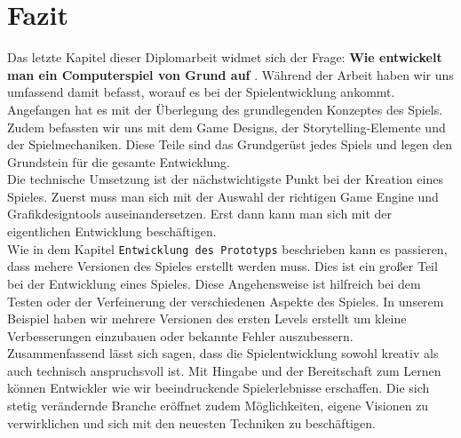 \pagebreak
{}

\chapter{Fazit} %
Das letzte Kapitel dieser Diplomarbeit widmet sich der Frage: \glqq \textbf{Wie entwickelt man ein Computerspiel von Grund auf} \grqq. Während der Arbeit haben wir uns umfassend damit befasst, worauf es bei der Spielentwicklung ankommt. \\

Angefangen hat es mit der Überlegung des grundlegenden Konzeptes des Spiels. Zudem befassten wir uns mit dem Game Designs, der Storytelling-Elemente und der Spielmechaniken. Diese Teile sind das Grundgerüst jedes Spiels und legen den Grundstein für die gesamte Entwicklung.\\

Die technische Umsetzung ist der nächstwichtigste Punkt bei der Kreation eines Spieles. Zuerst muss man sich mit der Auswahl der richtigen Game Engine und Grafikdesigntools auseinandersetzen. Erst dann kann man sich mit der eigentlichen Entwicklung beschäftigen.\\

Wie in dem Kapitel \verb+Entwicklung des Prototyps+ beschrieben kann es passieren, dass mehere Versionen des Spieles erstellt werden muss. Dies ist ein großer Teil bei der Entwicklung eines Spieles. Diese Angehensweise ist hilfreich bei dem Testen oder der Verfeinerung der verschiedenen Aspekte des Spieles. In unserem Beispiel haben wir mehrere Versionen des ersten Levels erstellt um kleine Verbesserungen einzubauen oder bekannte Fehler auszubessern.\\

Zusammenfassend lässt sich sagen, dass die Spielentwicklung sowohl kreativ als auch technisch anspruchsvoll ist. Mit Hingabe und der Bereitschaft zum Lernen können Entwickler wie wir beeindruckende Spielerlebnisse erschaffen. Die sich stetig verändernde Branche eröffnet zudem Möglichkeiten, eigene Visionen zu verwirklichen und sich mit den neuesten Techniken zu beschäftigen.